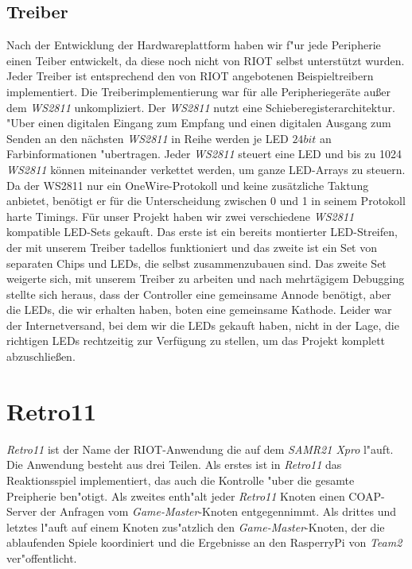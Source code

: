 \documentclass[a4paper]{article}
\begin{document}
  \subsection{Treiber}
    \label{sec:hardware_driver}
    Nach der Entwicklung der Hardwareplattform haben wir f"ur jede Peripherie
    einen Teiber entwickelt, da diese noch nicht von RIOT selbst unterstützt
    wurden. Jeder Treiber ist entsprechend den von RIOT angebotenen
    Beispieltreibern implementiert. Die Treiberimplementierung war für alle
    Peripheriegeräte außer dem \textit{WS2811} unkompliziert. Der
    \textit{WS2811} nutzt eine Schieberegisterarchitektur.  "Uber einen
    digitalen Eingang zum Empfang und einen digitalen Ausgang zum Senden an den
    nächsten \textit{WS2811} in Reihe werden je LED \( 24 bit\) an
    Farbinformationen "ubertragen.  Jeder \textit{WS2811} steuert eine LED und
    bis zu 1024 \textit{WS2811} können miteinander verkettet werden, um ganze
    LED-Arrays zu steuern. Da der WS2811 nur ein OneWire-Protokoll und keine
    zusätzliche Taktung anbietet, benötigt er für die Unterscheidung zwischen 0
    und 1 in seinem Protokoll harte Timings. Für unser Projekt haben wir zwei
    verschiedene \textit{WS2811} kompatible LED-Sets gekauft. Das erste ist ein
    bereits montierter LED-Streifen, der mit unserem Treiber tadellos
    funktioniert und das zweite ist ein Set von separaten Chips und LEDs, die
    selbst zusammenzubauen sind. Das zweite Set weigerte sich, mit unserem
    Treiber zu arbeiten und nach mehrtägigem Debugging stellte sich heraus,
    dass der Controller eine gemeinsame Annode benötigt, aber die LEDs, die wir
    erhalten haben, boten eine gemeinsame Kathode.  Leider war der
    Internetversand, bei dem wir die LEDs gekauft haben, nicht in der Lage, die
    richtigen LEDs rechtzeitig zur Verfügung zu stellen, um das Projekt
    komplett abzuschließen.

\section{Retro11}
  \label{sec:retro11}
  \textit{Retro11} ist der Name der RIOT-Anwendung die auf dem \textit{SAMR21
  Xpro} l"auft. Die Anwendung besteht aus drei Teilen. Als erstes ist in
  \textit{Retro11} das Reaktionsspiel implementiert, das auch die Kontrolle
  "uber die gesamte Preipherie ben"otigt. Als zweites enth"alt jeder
  \textit{Retro11} Knoten einen COAP-Server der Anfragen vom
  \textit{Game-Master}-Knoten entgegennimmt. Als drittes und letztes l"auft auf
  einem Knoten zus"atzlich den \textit{Game-Master}-Knoten, der die ablaufenden
  Spiele koordiniert und die Ergebnisse an den RasperryPi von \textit{Team2}
  ver"offentlicht.
\end{document}
